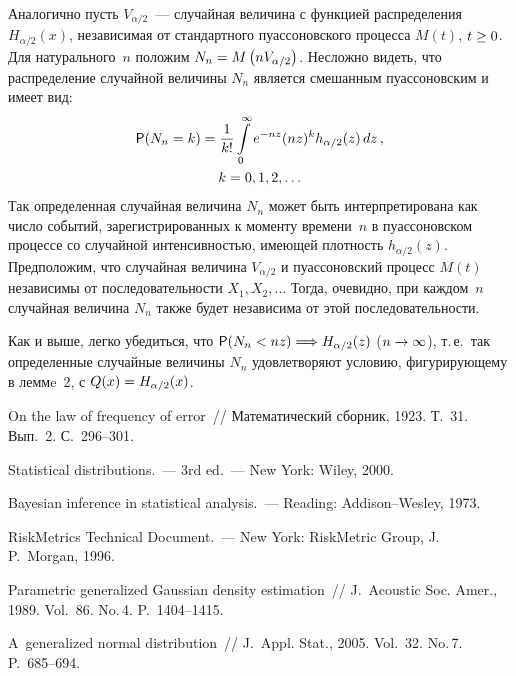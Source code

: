 \begin{multicols}{2}
Аналогично пусть $V_{\alpha/2}$~--- случайная величина с функцией
распределения $H_{\alpha/2}(x)$, независимая от стандартного
пуассоновского процесса $M(t)$, $t\hm\ge0$. Для натурального~$n$
положим $N_n\hm= M\left(nV_{\alpha/2}\right)$. Несложно видеть, что
распределение случайной величины $N_n$ является смешанным
пуассоновским и имеет вид:
\begin{multline*}
{\sf P}(N_n=k)=\displaystyle\frac{\displaystyle 1\mathstrut}{\displaystyle k!\mathstrut}\int\limits_{0}^{\infty}e^{-nz}(nz)^kh_{\alpha/2}(z)\,dz\,,\\
 k=0,1,2,\ldots
\end{multline*}
Так определенная случайная величина $N_n$ может быть
интерпретирована как число событий, зарегистрированных к моменту
времени~$n$ в пуассоновском процессе со случайной интенсивностью,
имеющей плотность $h_{\alpha/2}(z)$. Предположим, что случайная
величина $V_{\alpha/2}$ и пуассоновский процесс $M(t)$ независимы от
последовательности $X_1,X_2,\ldots$ Тогда, очевидно, при каждом~$n$
случайная величина $N_n$ также будет независима от этой
последовательности.

Как и выше, легко убедиться, что ${\sf P}(N_n\hm<nz)\hm\Longrightarrow
H_{\alpha/2}(z)$ ($n\hm\to\infty$), т.\,е.\ так определенные случайные
величины $N_n$ удовлетворяют условию, фигурирующему в леммe~2, с
$Q(x)\hm=H_{\alpha/2}(x)$.


{\small\frenchspacing
{%
\begin{thebibliography}{99}

 On the law of frequency
of error~// Математический сборник, 1923. Т.~31. Вып.~2.
С.~296--301.

 Statistical
distributions.~--- 3rd ed.~--- New York: Wiley, 2000.

  Bayesian inference in statistical analysis.~--- 
Reading: Addison--Wesley, 1973.

RiskMetrics Technical Document.~---
New York: RiskMetric Group, J.\,P.~Morgan, 1996.

 Parametric
generalized Gaussian density estimation~// J.~Acoustic
Soc. Amer., 1989. Vol.~86. No.\,4. P.~1404--1415.

 A~generalized normal
distribution~// J.~Appl. Stat., 2005. Vol.~32. No.\,7. P.~685--694.


\end{thebibliography}}}
\end{multicols}

